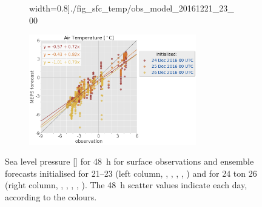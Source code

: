 \begin{figure}[t!]
\begin{subfigure}[b]{0.49\textwidth}
		width=0.8\textwidth]{./fig_sfc_temp/obs_model_20161221_23_00}
	\end{subfigure}
	\begin{subfigure}[b]{0.49\textwidth}
		\centering
		\includegraphics[trim={25.cm 15.5cm 0cm 3.6cm},clip,
		width=0.8\textwidth]{./fig_sfc_temp/obs_model_20161224_26_00}
	\end{subfigure}
	\caption{Sea level pressure [\SI{}{\hPa}] for \SI{48}{\hour} for surface observations and ensemble forecasts initialised for \SIrange{21}{23}{\dec} (left column, \protect{}, \protect{}, \protect{}, \protect{}, \protect{}) and  for \num{24} ton \SI{26}{\dec} (right column, \protect{}, \protect{}, \protect{}, \protect{}, \protect{}). The \SI{48}{\hour} scatter values indicate each day, according to the colours.  }\label{fig:scat:obs_meps}
\end{figure}
